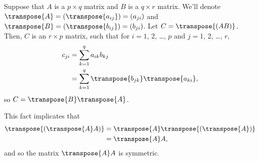Suppose that $A$ is a $p\times q$ matrix and $B$ is a $q\times r$ matrix.
We'll denote $\transpose{A}=(\transpose{a_{ij}})=(a_{ji})$ and $\transpose{B}=(\transpose{b_{ij}})=(b_{ji})$.
Let $C=\transpose{(AB)}$.
Then, $C$ is an $r\times p$ matrix, such that for $i=1$, 2, \dots, $p$ and $j=1$, 2, \dots, $r$,
\begin{align*}
    c_{ji} &= \sum_{k=1}^qa_{ik}b_{kj} \\
    &= \sum_{k=1}^q\transpose{b_{jk}}\transpose{a_{ki}},
\end{align*}
so $C=\transpose{B}\transpose{A}$.

This fact implicates that
\begin{align*}
    \transpose{\left(\transpose{A}A\right)} &= \transpose{A}\transpose{(\transpose{A})} \\
    &= \transpose{A}A,
\end{align*}
and so the matrix $\transpose{A}A$ is symmetric.
